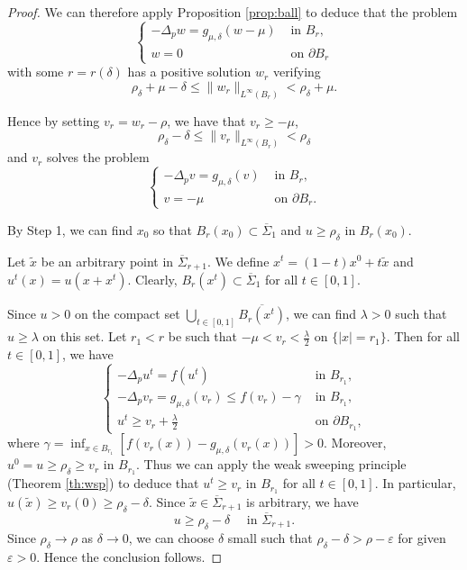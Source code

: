 \documentclass[reqno]{amsart}
\theoremstyle{plain}
\theoremstyle{definition}
\theoremstyle{remark}
\begin{document}
\begin{proof}
		We can therefore apply Proposition \ref{prop:ball} to deduce that the problem
		\[
		\begin{cases}
			-\Delta_p w = g_{\mu,\delta}(w-\mu) &\text{ in } B_r,\\
			w = 0 &\text{ on } \partial B_r
		\end{cases}
		\]
		with some $r=r(\delta)$ has a positive solution $w_r$ verifying
		\[
		\rho_\delta + \mu - \delta \le \|w_r\|_{L^\infty(B_r)} < \rho_\delta + \mu.
		\]
		
		Hence by setting $v_r=w_r-\rho$, we have that $v_r\ge-\mu$,
		\[
		\rho_\delta - \delta \le \|v_r\|_{L^\infty(B_r)} < \rho_\delta
		\]
		and $v_r$ solves the problem
		\[
		\begin{cases}
			-\Delta_p v = g_{\mu,\delta}(v) &\text{ in } B_r,\\
			v = -\mu &\text{ on } \partial B_r.
		\end{cases}
		\]
		
		By Step 1, we can find $x_0$ so that
		$B_r(x_0) \subset \overline\Sigma_1$ and $u \ge \rho_\delta$ in $B_r(x_0)$.
		
		Let $\tilde{x}$ be an arbitrary point in $\overline\Sigma_{r+1}$. We define $x^t = (1-t)x^0 + t\tilde{x}$ and $u^t(x)=u(x+x^t)$.
		Clearly, $B_r(x^t) \subset \overline\Sigma_1$ for all $t \in [0, 1]$.
		
		Since $u > 0$ on the compact set $\bigcup_{t\in[0,1]} \overline{B_r(x^t)}$, we can find $\lambda > 0$ such that $u \ge \lambda$ on this set. Let $r_1 < r$ be such that $-\mu < v_r < \frac{\lambda}{2}$ on $\{|x| = r_1\}$. Then for all $t \in [0, 1]$, we have
		\[
		\begin{cases}
			-\Delta_p u^t = f(u^t) & \text{ in } B_{r_1},\\
			-\Delta_p v_r = g_{\mu,\delta}(v_r) \le f(v_r) - \gamma & \text{ in } B_{r_1},\\
			u^t \ge v_r + \frac{\lambda}{2} & \text{ on } \partial B_{r_1},
		\end{cases}
		\]
		where $\gamma=\inf_{x\in B_{r_1}} [f (v_r(x)) - g_{\mu,\delta}(v_r(x))] > 0$. Moreover, $u^0 = u \ge \rho_\delta \ge v_r$ in $B_{r_1}$. Thus we can apply the weak sweeping principle (Theorem \ref{th:wsp}) to deduce that $u^t \ge v_r$ in $B_{r_1}$ for all $t \in [0, 1]$. In particular, $u(\tilde{x}) \ge v_r(0) \ge \rho_\delta - \delta$. Since $\tilde{x} \in \overline\Sigma_{r+1}$ is arbitrary, we have
		\[
		u \ge \rho_\delta - \delta \quad \text{ in } \overline\Sigma_{r+1}.
		\]
		Since $\rho_\delta\to\rho$ as $\delta\to0$, we can choose $\delta$ small such that $\rho_\delta - \delta > \rho - \varepsilon$ for given $\varepsilon>0$. Hence the conclusion follows.
		

\end{proof}
\end{document}
